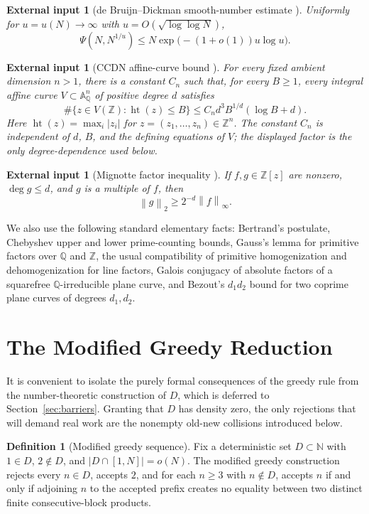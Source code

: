 \documentclass[11pt]{article}
\newtheorem{external}[theorem]{External input}
\theoremstyle{definition}
\newtheorem{definition}[theorem]{Definition}
\newcommand{\N}{\mathbb N}
\newcommand{\Z}{\mathbb Z}
\newcommand{\Q}{\mathbb Q}
\newcommand{\A}{\mathbb A}
\newcommand{\abs}[1]{\left|#1\right|}
\newcommand{\norm}[1]{\left\|#1\right\|}
\newcommand{\1}{\mathbf 1}
\DeclareMathOperator{\height}{ht}
\begin{document}
\begin{external}[de Bruijn--Dickman smooth-number estimate
\cite{deBruijn,Hildebrand}]\label{inp:dickman}
Uniformly for \(u=u(N)\to\infty\) with \(u=O(\sqrt{\log\log N})\),
\[
  \Psi(N,N^{1/u})\le
  N\exp\big(-(1+o(1))u\log u\big).
\]
\end{external}

\begin{external}[CCDN affine-curve bound \cite{CCDN}]\label{inp:CCDN}
For every fixed ambient dimension \(n>1\), there is a constant \(C_n\) such
that, for every \(B\ge1\), every integral affine curve \(V\subset\A^n_{\Q}\) of
positive degree \(d\) satisfies
\[
  \#\{z\in V(\Z):\height(z)\le B\}
  \le C_n d^3 B^{1/d}(\log B+d).
\]
Here \(\height(z)=\max_i |z_i|\) for \(z=(z_1,\ldots,z_n)\in\Z^n\).
The constant \(C_n\) is independent of \(d\), \(B\), and the defining
equations of \(V\); the displayed factor is the only degree-dependence used
below.
\end{external}

\begin{external}[Mignotte factor inequality \cite{Mignotte}]\label{inp:mignotte}
If \(f,g\in\Z[z]\) are nonzero, \(\deg g\le d\), and \(g\) is a multiple of
\(f\), then
\[
  \norm{g}_2\ge 2^{-d}\norm{f}_\infty .
\]
\end{external}

We also use the following standard elementary facts: Bertrand's postulate,
Chebyshev upper and lower prime-counting bounds, Gauss's lemma for primitive
factors over \(\Q\) and \(\Z\), the usual compatibility of primitive
homogenization and dehomogenization for line factors, Galois conjugacy of
absolute factors of a squarefree \(\Q\)-irreducible plane curve, and Bezout's
\(d_1d_2\) bound for two coprime plane curves of degrees \(d_1,d_2\).

\section{The Modified Greedy Reduction}\label{sec:greedy}

It is convenient to isolate the purely formal consequences of the greedy rule
from the number-theoretic construction of \(D\), which is deferred to
Section~\ref{sec:barriers}.  Granting that \(D\) has density zero, the only
rejections that will demand real work are the nonempty old-new collisions
introduced below.

\begin{definition}[Modified greedy sequence]\label{def:modified-greedy}
Fix a deterministic set \(D\subset\N\) with \(1\in D\), \(2\notin D\), and
\(\abs{D\cap[1,N]}=o(N)\).  The modified greedy construction rejects every
\(n\in D\), accepts \(2\), and for each \(n\ge3\) with \(n\notin D\), accepts
\(n\) if and only if adjoining \(n\) to the accepted prefix creates no equality
between two distinct finite consecutive-block products.
\end{definition}
\end{document}

